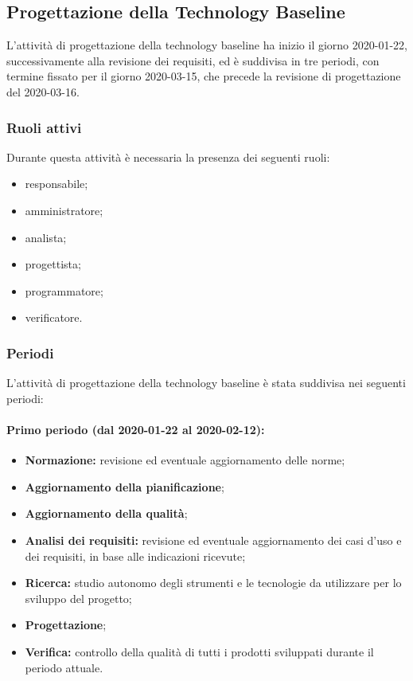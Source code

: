 		\subsection{Progettazione della Technology Baseline}
	
			L'attività di progettazione della technology baseline ha inizio il giorno 2020-01-22, successivamente alla revisione dei requisiti, ed è suddivisa in tre periodi, con termine fissato per il giorno 2020-03-15, che precede la revisione di progettazione del 2020-03-16.
			
			\subsubsection{Ruoli attivi}
			
				Durante questa attività è necessaria la presenza dei seguenti ruoli:
				\begin{itemize}
					\item responsabile;
					\item amministratore;
					\item analista;
					\item progettista;
					\item programmatore;
					\item verificatore.
				\end{itemize}
			
			\subsubsection{Periodi}
			
				L'attività di progettazione della technology baseline è stata suddivisa nei seguenti periodi:
				
				\paragraph{Primo periodo (dal 2020-01-22 al 2020-02-12):}
				
					\begin{itemize}
					 	\item \textbf{Normazione:} revisione ed eventuale aggiornamento delle norme;
					 	\item \textbf{Aggiornamento della pianificazione};
					 	\item \textbf{Aggiornamento della qualità};
					 	\item \textbf{Analisi dei requisiti:} revisione ed eventuale aggiornamento dei casi d'uso e dei requisiti, in base alle indicazioni ricevute;
					 	\item \textbf{Ricerca:} studio autonomo degli strumenti e le tecnologie da utilizzare per lo sviluppo del progetto;
					 	\item \textbf{Progettazione};
					 	\item \textbf{Verifica:} controllo della qualità di tutti i prodotti sviluppati durante il periodo attuale.
					\end{itemize} 	
				
